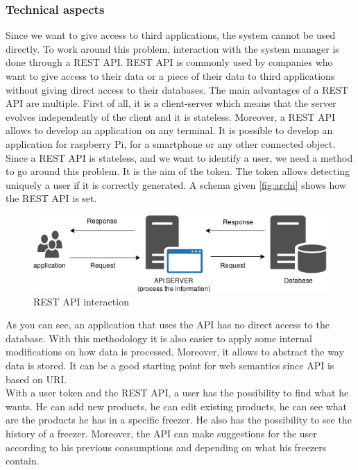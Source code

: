 \subsubsection{Technical aspects}
Since we want to give access to third applications, the system cannot be used directly. To work around this problem, interaction with the system manager is done through a REST API. REST API is commonly used by companies who want to give access to their data or a piece of their data to third applications without giving direct access to their databases. The main advantages of a REST API are multiple. First of all, it is a client-server which means that the server evolves independently of the client and it is stateless. Moreover, a REST API allows to develop an application on any terminal. It is possible to develop an application for raspberry Pi, for a smartphone or any other connected object. Since a REST API is stateless, and we want to identify a user, we need a method to go around this problem. It is the aim of the token. The token allows detecting uniquely a user if it is correctly generated. A schema given \autoref{fig:archi} shows how the REST API is set. \\
\begin{figure}[H]
\centering
\includegraphics[scale=0.5]{./images/archi.png}
\caption{REST API interaction}
\label{fig:archi}
\end{figure}

As you can see, an application that uses the API has no direct access to the database. With this methodology it is also easier to apply some internal modifications on how data is processed. Moreover, it allows to abstract the way data is stored. It can be a good starting point for web semantics since API is based on URI.\\

With a user token and the REST API, a user has the possibility to find what he wants. He can add new products, he can edit existing products, he can see what are the products he has in a specific freezer. He also has the possibility to see the history of a freezer. Moreover, the API can make suggestions for the user according to his previous consumptions and depending on what his freezers contain.\\

